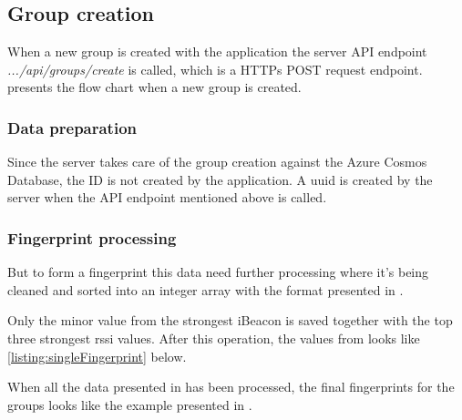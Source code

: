 \subsection{Group creation}\label{sec:implServerGroupCreation}
When a new group is created with the application the server API endpoint \textit{.../api/groups/create} is called, which is a HTTPs POST request endpoint.
 presents the flow chart when a new group is created.



\subsubsection{Data preparation}\label{sec:implServerGroupCreationDataPrep}
Since the server takes care of the group creation against the Azure Cosmos Database, the ID is not created by the application.
A \acrfull{uuid} is created by the server when the API endpoint mentioned above is called.


\subsubsection{Fingerprint processing}\label{sec:implServerGroupCreationFingerprint}
But to form a fingerprint this data need further processing where it's being cleaned and sorted into an integer array with the format presented in .


Only the minor value from the strongest iBeacon is saved together with the top three strongest \acrshort{rssi} values. After this operation, the values from  looks like \cref{listing:singleFingerprint} below.


When all the data presented in   has been processed, the final fingerprints for the groups looks like the example presented in .

